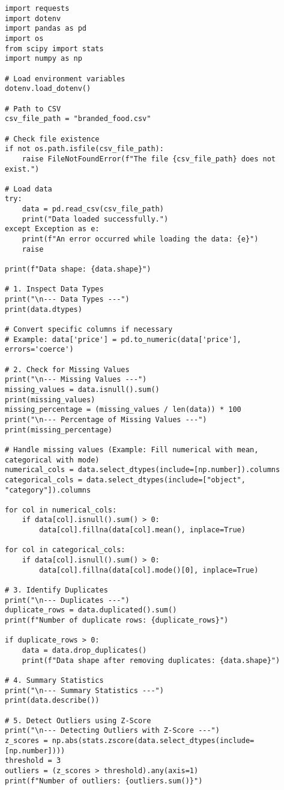 \documentclass{article}
\begin{document}
\begin{lstlisting}[caption={Validate the Data}, label={lst:validate_data}]
import requests
import dotenv
import pandas as pd
import os
from scipy import stats
import numpy as np

# Load environment variables
dotenv.load_dotenv()

# Path to CSV
csv_file_path = "branded_food.csv"

# Check file existence
if not os.path.isfile(csv_file_path):
    raise FileNotFoundError(f"The file {csv_file_path} does not exist.")

# Load data
try:
    data = pd.read_csv(csv_file_path)
    print("Data loaded successfully.")
except Exception as e:
    print(f"An error occurred while loading the data: {e}")
    raise

print(f"Data shape: {data.shape}")

# 1. Inspect Data Types
print("\n--- Data Types ---")
print(data.dtypes)

# Convert specific columns if necessary
# Example: data['price'] = pd.to_numeric(data['price'], errors='coerce')

# 2. Check for Missing Values
print("\n--- Missing Values ---")
missing_values = data.isnull().sum()
print(missing_values)
missing_percentage = (missing_values / len(data)) * 100
print("\n--- Percentage of Missing Values ---")
print(missing_percentage)

# Handle missing values (Example: Fill numerical with mean, categorical with mode)
numerical_cols = data.select_dtypes(include=[np.number]).columns
categorical_cols = data.select_dtypes(include=["object", "category"]).columns

for col in numerical_cols:
    if data[col].isnull().sum() > 0:
        data[col].fillna(data[col].mean(), inplace=True)

for col in categorical_cols:
    if data[col].isnull().sum() > 0:
        data[col].fillna(data[col].mode()[0], inplace=True)

# 3. Identify Duplicates
print("\n--- Duplicates ---")
duplicate_rows = data.duplicated().sum()
print(f"Number of duplicate rows: {duplicate_rows}")

if duplicate_rows > 0:
    data = data.drop_duplicates()
    print(f"Data shape after removing duplicates: {data.shape}")

# 4. Summary Statistics
print("\n--- Summary Statistics ---")
print(data.describe())

# 5. Detect Outliers using Z-Score
print("\n--- Detecting Outliers with Z-Score ---")
z_scores = np.abs(stats.zscore(data.select_dtypes(include=[np.number])))
threshold = 3
outliers = (z_scores > threshold).any(axis=1)
print(f"Number of outliers: {outliers.sum()}")


\end{lstlisting}
\end{document}

